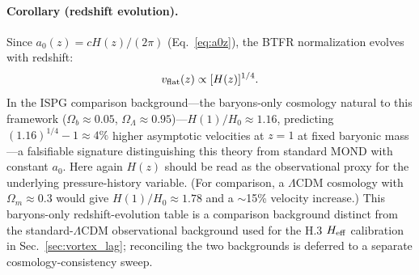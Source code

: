 \documentclass[11pt]{article}
\begin{document}
\paragraph{Corollary (redshift evolution).}
Since $a_0(z) = cH(z)/(2\pi)$ (Eq.~\eqref{eq:a0z}), the BTFR normalization evolves with redshift:
\begin{equation}
v_{\rm flat}(z) \propto [H(z)]^{1/4}.
\label{eq:btfr_z}
\end{equation}
In the ISPG comparison background---the baryons-only cosmology
natural to this framework ($\Omega_b \approx 0.05$,
$\Omega_\Lambda \approx 0.95$)---$H(1)/H_0 \approx 1.16$,
predicting $(1.16)^{1/4} - 1 \approx 4\%$ higher asymptotic
velocities at $z = 1$ at fixed baryonic mass---a falsifiable
signature distinguishing this theory from standard MOND with
constant $a_0$.  Here again $H(z)$ should be read as the
observational proxy for the underlying pressure-history variable.
(For comparison, a $\Lambda$CDM cosmology with
$\Omega_m \approx 0.3$ would give $H(1)/H_0 \approx 1.78$ and a
$\sim$15\% velocity increase.)  This baryons-only
redshift-evolution table is a comparison background distinct from
the standard-$\Lambda$CDM observational background used for the
H.3 $H_{\rm eff}$ calibration in Sec.~\ref{sec:vortex_lag};
reconciling the two backgrounds is deferred to a separate
cosmology-consistency sweep.
\end{document}
